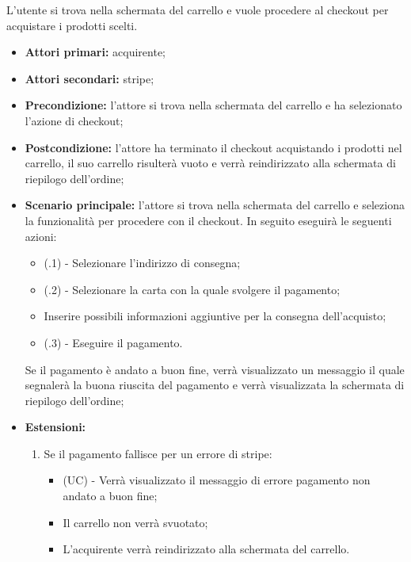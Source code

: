 L'utente si trova nella schermata del carrello e vuole procedere al checkout per acquistare i prodotti scelti.
\begin{itemize}
    \item \textbf{Attori primari:} acquirente;
    \item \textbf{Attori secondari:} stripe;
    \item \textbf{Precondizione:} l'attore si trova nella schermata del carrello e ha selezionato l'azione di checkout;
    \item \textbf{Postcondizione:} l'attore ha terminato il checkout acquistando i prodotti nel carrello, il suo carrello risulterà vuoto e verrà reindirizzato alla schermata di riepilogo dell'ordine;
    \item \textbf{Scenario principale:} l'attore si trova nella schermata del carrello e seleziona la funzionalità per procedere con il checkout. In seguito eseguirà le seguenti azioni:
    \begin{itemize}
    	\item (\actualUC.1) - Selezionare l'indirizzo di consegna;
    	\item (\actualUC.2) - Selezionare la carta con la quale svolgere il pagamento;
    	\item Inserire possibili informazioni aggiuntive per la consegna dell'acquisto;
        \item (\actualUC.3) - Eseguire il pagamento.
    \end{itemize}
    Se il pagamento è andato a buon fine, verrà visualizzato un messaggio il quale segnalerà la buona riuscita del pagamento e verrà visualizzata la schermata di riepilogo dell'ordine;
    \item \textbf{Estensioni:}
    \begin{enumerate}[label=\lett]
        \item Se il pagamento fallisce per un errore di stripe:
        \begin{itemize}
            \item (UC) - Verrà visualizzato il messaggio di errore pagamento non andato a buon fine;
            \item Il carrello non verrà svuotato;
            \item L'acquirente verrà reindirizzato alla schermata del carrello.
        \end{itemize}
    \end{enumerate}
\end{itemize}

\resetSubUC

